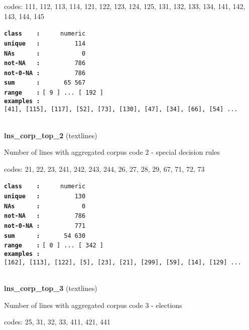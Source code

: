 \documentclass[]{article}
\begin{document}
codes: 111, 112, 113, 114, 121, 122, 123, 124, 125, 131, 132, 133, 134,
141, 142, 143, 144, 145

\textbf{\texttt{class\ \ \ \ :}} \texttt{~~~~~numeric}\\
\textbf{\texttt{unique\ \ \ :}} \texttt{~~~~~~~~~114}\\
\textbf{\texttt{NAs\ \ \ \ \ \ :}} \texttt{~~~~~~~~~~~0}\\
\textbf{\texttt{not-NA\ \ \ :}} \texttt{~~~~~~~~~786}\\
\textbf{\texttt{not-0-NA\ :}} \texttt{~~~~~~~~~786}\\
\textbf{\texttt{sum\ \ \ \ \ \ :}} \texttt{~~~~~~65~567}\\
\textbf{\texttt{range\ \ \ \ :}}
\texttt{{[}\ 9\ {]}\ ...\ {[}\ 192\ {]}}\\
\textbf{\texttt{examples\ :}}
\texttt{{[}41{]},\ {[}115{]},\ {[}117{]},\ {[}52{]},\ {[}73{]},\ {[}130{]},\ {[}47{]},\ {[}34{]},\ {[}66{]},\ {[}54{]}\ ...}\\

~

\textbf{lns\_corp\_top\_2} (textlines)

Number of lines with aggregated corpus code 2 - special decision rules

codes: 21, 22, 23, 241, 242, 243, 244, 26, 27, 28, 29, 67, 71, 72, 73

\textbf{\texttt{class\ \ \ \ :}} \texttt{~~~~~numeric}\\
\textbf{\texttt{unique\ \ \ :}} \texttt{~~~~~~~~~130}\\
\textbf{\texttt{NAs\ \ \ \ \ \ :}} \texttt{~~~~~~~~~~~0}\\
\textbf{\texttt{not-NA\ \ \ :}} \texttt{~~~~~~~~~786}\\
\textbf{\texttt{not-0-NA\ :}} \texttt{~~~~~~~~~771}\\
\textbf{\texttt{sum\ \ \ \ \ \ :}} \texttt{~~~~~~54~630}\\
\textbf{\texttt{range\ \ \ \ :}}
\texttt{{[}\ 0\ {]}\ ...\ {[}\ 342\ {]}}\\
\textbf{\texttt{examples\ :}}
\texttt{{[}162{]},\ {[}113{]},\ {[}122{]},\ {[}5{]},\ {[}23{]},\ {[}21{]},\ {[}299{]},\ {[}59{]},\ {[}14{]},\ {[}129{]}\ ...}\\

~

\textbf{lns\_corp\_top\_3} (textlines)

Number of lines with aggregated corpus code 3 - elections

codes: 25, 31, 32, 33, 411, 421, 441
\end{document}
